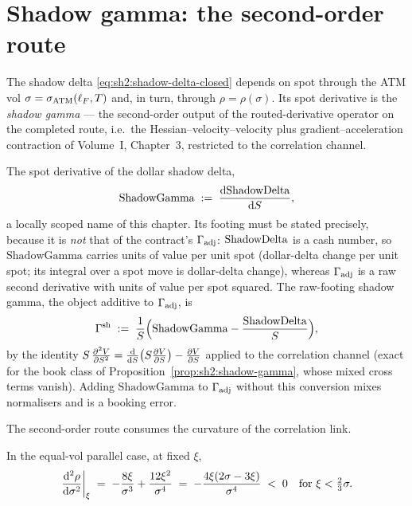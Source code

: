 \section{Shadow gamma: the second-order route}\label{sec:sh2:shadow-gamma}

The shadow delta \eqref{eq:sh2:shadow-delta-closed} depends on spot through
the ATM vol $\sigma = \sigma_{\mathrm{ATM}}(\ell_F, T)$ and, in turn, through
$\rho = \rho(\sigma)$. Its spot derivative is the \emph{shadow gamma} ---
the second-order output of the routed-derivative operator on the completed
route, i.e.\ the Hessian--velocity--velocity plus gradient--acceleration
contraction of Volume~I, Chapter~3, restricted to the correlation channel.

\begin{definition}\label{def:sh2:shadow-gamma}
The spot derivative of the dollar shadow delta,
\begin{equation}\label{eq:sh2:shadow-gamma-def}
  \mathrm{ShadowGamma} \;:=\; \frac{\mathrm{d} \mathrm{ShadowDelta}}{\mathrm{d} S},
\end{equation}
a locally scoped name of this chapter. Its footing must be stated
precisely, because it is \emph{not} that of the contract's $\Gamma_{\mathrm{adj}}$:
$\mathrm{ShadowDelta}$ is a cash number, so $\mathrm{ShadowGamma}$ carries units of
value per unit spot (dollar-delta change per unit spot; its integral over
a spot move is dollar-delta change), whereas $\Gamma_{\mathrm{adj}}$ is a raw second
derivative with units of value per spot squared. The raw-footing shadow
gamma, the object additive to $\Gamma_{\mathrm{adj}}$, is
\begin{equation}\label{eq:sh2:shadow-gamma-raw}
  \Gamma^{\mathrm{sh}}
  \;:=\; \frac{1}{S}\Bigl(\mathrm{ShadowGamma} - \frac{\mathrm{ShadowDelta}}{S}\Bigr),
\end{equation}
by the identity $S\,\frac{\partial^2 V}{\partial S^2} = \frac{\mathrm{d} }{\mathrm{d} S}\bigl(S \frac{\partial V}{\partial S}\bigr) -
\frac{\partial V}{\partial S}$ applied to the correlation channel (exact for the book class of
Proposition~\ref{prop:sh2:shadow-gamma}, whose mixed cross terms vanish).
Adding $\mathrm{ShadowGamma}$ to $\Gamma_{\mathrm{adj}}$ without this conversion mixes
normalisers and is a booking error.
\end{definition}

The second-order route consumes the curvature of the correlation link.

\begin{lemma}\label{lem:sh2:rho-concave}
In the equal-vol parallel case, at fixed $\xi$,
\begin{equation}\label{eq:sh2:d2rho-dsigma2}
  \left.\frac{\mathrm{d}^2 \rho}{\mathrm{d} \sigma^2}\right|_{\xi}
  \;=\; -\frac{8\xi}{\sigma^3} + \frac{12\xi^2}{\sigma^4}
  \;=\; -\frac{4\xi(2\sigma - 3\xi)}{\sigma^4}
  \;<\; 0 \quad \text{for } \xi < \tfrac23 \sigma .
\end{equation}
\end{lemma}

